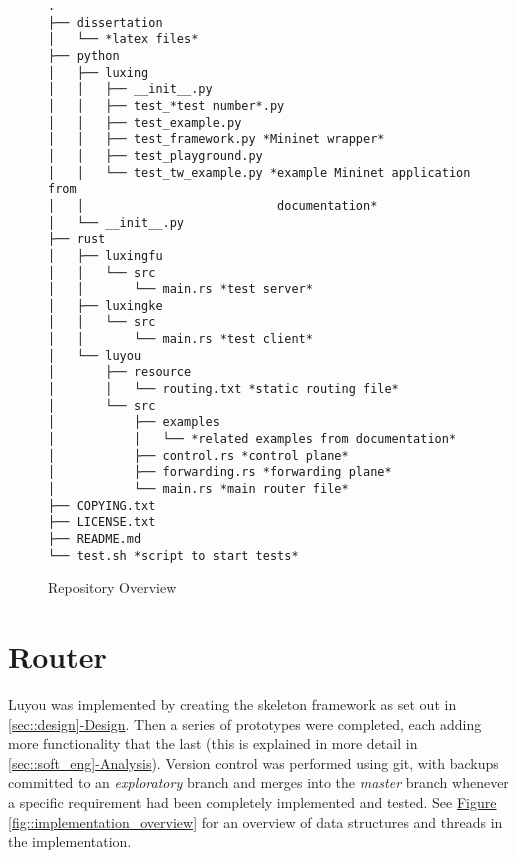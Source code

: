 \documentclass[12pt,a4paper,twoside,openright]{report}
\begin{document}
\begin{figure}
\begin{lstlisting}[style=tree]
.
├── dissertation
│   └── *latex files*
├── python
│   ├── luxing
│   │   ├── __init__.py
│   │   ├── test_*test number*.py
│   │   ├── test_example.py
│   │   ├── test_framework.py *Mininet wrapper*
│   │   ├── test_playground.py 
│   │   └── test_tw_example.py *example Mininet application from
│   │                           documentation*
│   └── __init__.py
├── rust
│   ├── luxingfu
│   │   └── src
│   │       └── main.rs *test server*
│   ├── luxingke
│   │   └── src
│   │       └── main.rs *test client*
│   └── luyou
│       ├── resource
│       │   └── routing.txt *static routing file*
│       └── src
│           ├── examples
│           │   └── *related examples from documentation*
│           ├── control.rs *control plane*
│           ├── forwarding.rs *forwarding plane*
│           └── main.rs *main router file*
├── COPYING.txt
├── LICENSE.txt
├── README.md
└── test.sh *script to start tests*
\end{lstlisting}
\caption{Repository Overview}
\label{fig::repository_overview}
\end{figure}

\pagebreak

\section{Router}
\label{sec::router}

Luyou was implemented by creating the skeleton framework as set out in \ref{sec::design}\hyperref[sec::design]{-Design}.  Then a series of prototypes were completed, each adding more functionality that the last (this is explained in more detail in \ref{sec::soft_eng}\hyperref[sec::soft_eng]{-Analysis}).  Version control was performed using git\cite{git}, with backups committed to an \textit{exploratory} branch and merges into the \textit{master} branch whenever a specific requirement had been completely implemented and tested.  See \hyperref[fig::implementation_overview]{Figure }\ref{fig::implementation_overview} for an overview of data structures and threads in the implementation.
\end{document}
